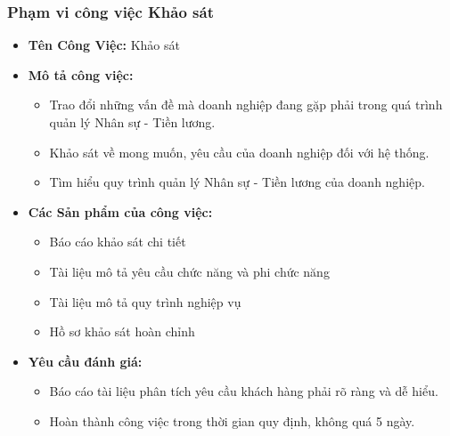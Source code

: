 \subsubsection{Phạm vi công việc Khảo sát}
\begin{itemize}
    \item \textbf{Tên Công Việc:} Khảo sát
    \item \textbf{Mô tả công việc:}
    \begin{itemize}
        \item Trao đổi những vấn đề mà doanh nghiệp đang gặp phải trong quá trình quản lý Nhân sự - Tiền lương.
        \item Khảo sát về mong muốn, yêu cầu của doanh nghiệp đối với hệ thống.
        \item Tìm hiểu quy trình quản lý Nhân sự - Tiền lương của doanh nghiệp.
    \end{itemize}
    \item \textbf{Các Sản phẩm của công việc:}
    \begin{itemize}
        \item Báo cáo khảo sát chi tiết
        \item Tài liệu mô tả yêu cầu chức năng và phi chức năng
        \item Tài liệu mô tả quy trình nghiệp vụ
        \item Hồ sơ khảo sát hoàn chỉnh
    \end{itemize}
    \item \textbf{Yêu cầu đánh giá:}
    \begin{itemize}
        \item Báo cáo tài liệu phân tích yêu cầu khách hàng phải rõ ràng và dễ hiểu.
        \item Hoàn thành công việc trong thời gian quy định, không quá 5 ngày.
    \end{itemize}
\end{itemize}

